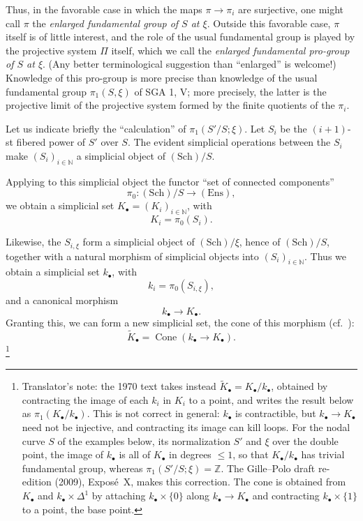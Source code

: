 Thus, in the favorable case in which the maps \(\pi\to\pi_i\) are
surjective, one might call \(\pi\) the \emph{enlarged fundamental group of
\(S\) at \(\xi\)}. Outside this favorable case, \(\pi\) itself is of
little interest, and the role of the usual fundamental group is played by
the projective system \(\Pi\) itself, which we call the \emph{enlarged
fundamental pro-group of \(S\) at \(\xi\)}. (Any better terminological
suggestion than ``enlarged'' is welcome!) Knowledge of this
pro-group is more precise than knowledge of the usual fundamental group
\(\pi_1(S,\xi)\) of SGA 1, V; more precisely, the latter is the projective
limit of the projective system formed by the finite quotients of the
\(\pi_i\).

Let us indicate briefly the ``calculation'' of \(\pi_1(S'/S;\xi)\). Let
\(S_i\) be the \((i+1)\)-st fibered power of \(S'\) over \(S\). The evident
simplicial operations
between the \(S_i\) make \((S_i)_{i\in\mathbb N}\) a simplicial object of
\((\mathrm{Sch})/S\).

Applying to this simplicial object the functor ``set of connected
components''
\[
  \pi_0:(\mathrm{Sch})/S\longrightarrow(\mathrm{Ens}),
\]
we obtain a simplicial set \(K_\bullet=(K_i)_{i\in\mathbb N}\), with
\[
  K_i=\pi_0(S_i).
\]

Likewise, the \(S_{i,\xi}\) form a simplicial object of
\((\mathrm{Sch})/\xi\), hence of \((\mathrm{Sch})/S\), together with a
natural morphism of simplicial objects into \((S_i)_{i\in\mathbb N}\).
Thus we obtain a simplicial set \(k_\bullet\), with
\[
  k_i=\pi_0(S_{i,\xi}),
\]
and a canonical morphism
\[
  k_\bullet\longrightarrow K_\bullet.
\]
Granting this, we can form a new simplicial set, the cone of this morphism
(cf.\ ):
\[
  \widetilde K_\bullet
  =
  \operatorname{Cone}(k_\bullet\longrightarrow K_\bullet).
\]
\footnote{Translator's note: the 1970 text takes instead
\(\widetilde K_\bullet=K_\bullet/k_\bullet\), obtained by contracting the
image of each \(k_i\) in \(K_i\) to a point, and writes the result below as
\(\pi_1(K_\bullet/k_\bullet)\). This is not correct in general: \(k_\bullet\)
is contractible, but \(k_\bullet\to K_\bullet\) need not be injective, and
contracting its image can kill loops. For the nodal curve \(S\) of the
examples below, its normalization \(S'\) and \(\xi\) over the double point,
the image of \(k_\bullet\) is all of \(K_\bullet\) in degrees \(\leq1\), so
that \(K_\bullet/k_\bullet\) has trivial fundamental group, whereas
\(\pi_1(S'/S;\xi)=\mathbb Z\). The Gille--Polo draft re-edition (2009),
Expos\'e~X, makes this correction. The cone is obtained from \(K_\bullet\)
and \(k_\bullet\times\Delta^1\) by attaching \(k_\bullet\times\{0\}\) along
\(k_\bullet\to K_\bullet\) and contracting \(k_\bullet\times\{1\}\) to a point,
the base point.}

